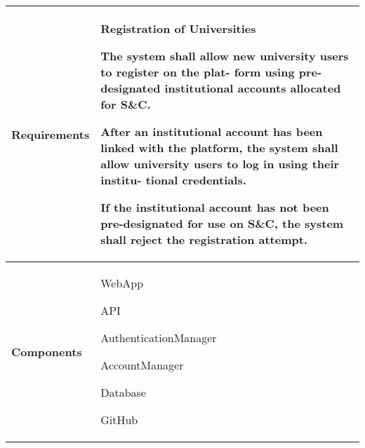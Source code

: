 \begin{table}[ht]
    \centering
    \renewcommand{\arraystretch}{1.5} %
    \begin{tabular}{|C{0.3\textwidth}|L{0.65\textwidth}|} %
        \hline
        \textbf{Requirements} & 
        \textbf{Registration of Universities} \par
        [FR10] The system shall allow new university users to register on the plat-
        form using pre-designated institutional accounts allocated for S\&C. \par
        [FR11] After an institutional account has been linked with the platform,
        the system shall allow university users to log in using their institu-
        tional credentials. \par
        [FR12] If the institutional account has not been pre-designated for use on
        S\&C, the system shall reject the registration attempt. \\
        \hline
        \textbf{Components} & 
        WebApp \par
        API \par
        AuthenticationManager \par
        AccountManager \par
        Database \par
        GitHub \\
        \hline
    \end{tabular}
\end{table}


